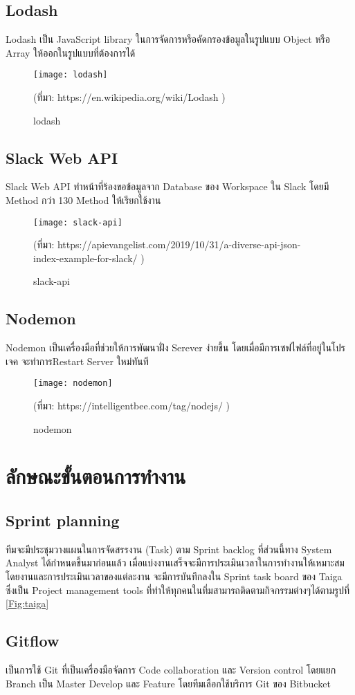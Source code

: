\subsection{Lodash}
Lodash เป็น JavaScript library ในการจัดการหรือคัดกรองข้อมูลในรูปแบบ Object หรือ Array ให้ออกในรูปแบบที่ต้องการได้
\begin{figure}[!h]
	\centering
	\texttt{[image: lodash]}
	\caption{lodash}
	(ที่มา: 
	https://en.wikipedia.org/wiki/Lodash
	)
	\label{Fig:lodash}
\end{figure}
\subsection{Slack Web API}
Slack Web API ทำหน้าที่ร้องขอข้อมูลจาก Database ของ Workspace ใน Slack โดยมี Method กว่า 130 Method ให้เรียกใช้งาน
\\
\begin{figure}[!h]
	\centering
	\texttt{[image: slack-api]}
	\caption{slack-api}
	(ที่มา: 
	https://apievangelist.com/2019/10/31/a-diverse-api-json-index-example-for-slack/
	)
	\label{Fig:slack-api}
\end{figure}
\subsection{Nodemon}
Nodemon เป็นเครื่องมือที่ช่วยให้การพัฒนาฝั่ง Serever ง่ายขึ้น โดยเมื่อมีการเซฟไฟล์ที่อยู่ในโปรเจค จะทำการRestart Server ใหม่ทันที
\begin{figure}[!h]
	\centering
	\texttt{[image: nodemon]}
	\caption{nodemon}
	(ที่มา: 
	https://intelligentbee.com/tag/nodejs/
	)
	\label{Fig:nodemon}
\end{figure}
\section{ลักษณะขั้นตอนการทำงาน}
\subsection{Sprint planning}
ทีมจะมีประชุมวางแผนในการจัดสรรงาน (Task) ตาม Sprint backlog ที่ส่วนนี้ทาง System Analyst ได้กำหนดขึ้นมาก่อนแล้ว เมื่อแบ่งงานเสร็จจะมีการประเมินเวลาในการทำงานให้เหมาะสม โดยงานและการประเมินเวลาของแต่ละงาน จะมีการบันทึกลงใน Sprint task board ของ Taiga ซึ่งเป็น Project management tools ที่ทำให้ทุกคนในที่มสามารถติดตามกิจกรรมต่างๆได้ตามรูปที่ \ref{Fig:taiga}
\subsection{Gitflow}
เป็นการใช้ Git ที่เป็นเครื่องมือจัดการ Code collaboration และ Version control โดยแยก Branch เป็น Master Develop และ Feature โดยทีมเลือกใช้บริการ Git ของ Bitbucket

